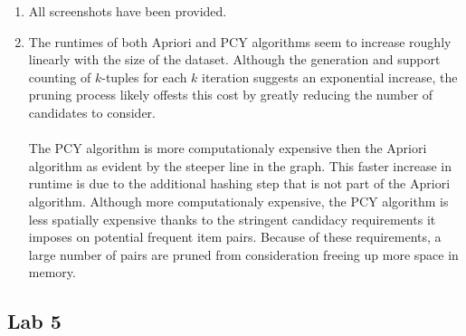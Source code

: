 \documentclass{article}
\begin{document}
\begin{enumerate}[label=\alph*., left=10pt, itemsep=10pt]
        \item \begin{minipage}[t]{0.9\textwidth}
            All screenshots have been provided.
        \end{minipage}
        
        \item \begin{minipage}[t]{0.9\textwidth}
            The runtimes of both Apriori and PCY algorithms seem to increase roughly linearly with
            the size of the dataset. Although the generation and support counting of $k$-tuples for
            each $k$ iteration suggests an exponential increase, the pruning process likely offests
            this cost by greatly reducing the number of candidates to consider. 
            \\\\
            The PCY algorithm is more computationaly expensive then the Apriori algorithm as evident
            by the steeper line in the graph. This faster increase in runtime is due to the
            additional hashing step that is not part of the Apriori algorithm.
            Although more computationaly expensive, the PCY algorithm is less spatially expensive
            thanks to the stringent candidacy requirements it imposes on potential frequent item pairs.
            Because of these requirements, a large number of pairs are pruned from consideration
            freeing up more space in memory.

        \end{minipage}

    \end{enumerate}

    \subsection*{Lab 5} 
\end{document}
